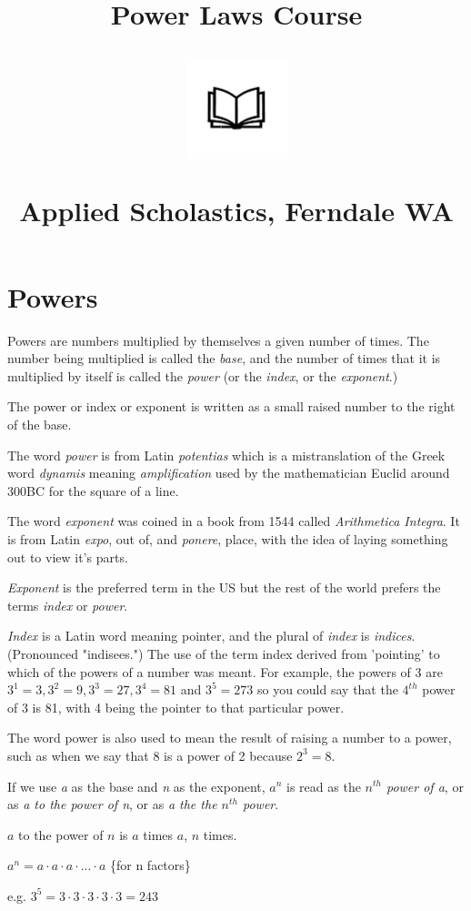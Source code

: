 \documentclass{article}
\author{}
\date{}
\title{Power Laws Course\\
\vspace{28pt}
\begin{center}
\includegraphics[width=4em]{ApS_logo.png}
\end{center}
\begin{normalsize}
Applied Scholastics, Ferndale WA
\end{normalsize}}
\begin{document}
\maketitle

\section*{Powers}
Powers are numbers multiplied by themselves a given number of times. The number being multiplied is called the \textit{base}, and the number of times that it is multiplied by itself is called the \textit{power} (or the \textit{index}, or the \textit{exponent}.)

The power or index or exponent is written as a small raised number to the right of the base.

The word \textit{power} is from Latin \textit{potentias} which is a mistranslation of the Greek word \textit{dynamis} meaning \textit{amplification} used by the mathematician Euclid around 300BC for the square of a line.

The word \textit{exponent} was coined in a book from 1544 called \textit{Arithmetica Integra}. It is from Latin \textit{expo}, out of, and \textit{ponere}, place, with the idea of laying something out to view it's parts.

\textit{Exponent} is the preferred term in the US but the rest of the world prefers the terms \textit{index} or \textit{power}.

\textit{Index} is a Latin word meaning pointer, and the plural of \textit{index} is \textit{indices}. (Pronounced "indisees.") The use of the term index derived from 'pointing' to which of the powers of a number was meant. For example, the powers of 3 are $3^1=3, 3^2=9, 3^3=27, 3^4=81$ and $3^5=273$ so you could say that the $4^{th}$ power of 3 is 81, with 4 being the pointer to that particular power.

The word power is also used to mean the result of raising a number to a power, such as when we say that 8 is a power of 2 because $2^3=8$.

If we use \textit{a} as the base and \textit{n} as the exponent, $a^n$ is read as the \textit{$n^{th}$ power of a}, or as \textit{a to the power of n}, or as \textit{a the the $n^{th}$ power}.

$a$ to the power of $n$ is $a$ times $a$, $n$ times.

${a^n = a\cdot a\cdot a \cdot ... \cdot a}$ \{for n factors\}

e.g. ${3^5 = 3 \cdot 3 \cdot 3 \cdot 3 \cdot 3 = 243}$
\end{document}
